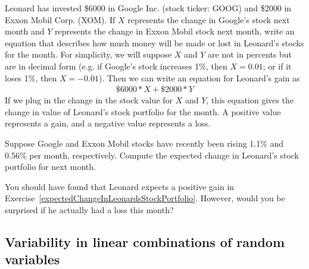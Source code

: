 \begin{example}{Leonard has invested \$6000 in Google Inc. (stock ticker: GOOG) and \$2000 in Exxon Mobil Corp. (XOM). If $X$ represents the change in Google's stock next month and $Y$ represents the change in Exxon Mobil stock next month, write an equation that describes how much money will be made or lost in Leonard's stocks for the month.}
For simplicity, we will suppose $X$ and $Y$ are not in percents but are in decimal form (e.g. if Google's stock increases 1\%, then $X=0.01$; or if it loses 1\%, then $X=-0.01$). Then we can write an equation for Leonard's gain as
\begin{align*}
\$6000*X + \$2000*Y
\end{align*}
If we plug in the change in the stock value for $X$ and $Y$, this equation gives the change in value of Leonard's stock portfolio for the month. A positive value represents a gain, and a negative value represents a loss.
\end{example}

\begin{exercise}\label{expectedChangeInLeonardsStockPortfolio}
Suppose Google and Exxon Mobil stocks have recently been rising 1.1\% and 0.56\% per month, respectively. Compute the expected change in Leonard's stock portfolio for next month.
\end{exercise}

\begin{exercise}
You should have found that Leonard expects a positive gain in Exercise~\ref{expectedChangeInLeonardsStockPortfolio}. However, would you be surprised if he actually had a loss this month?
\end{exercise}


\subsection{Variability in linear combinations of random variables}

